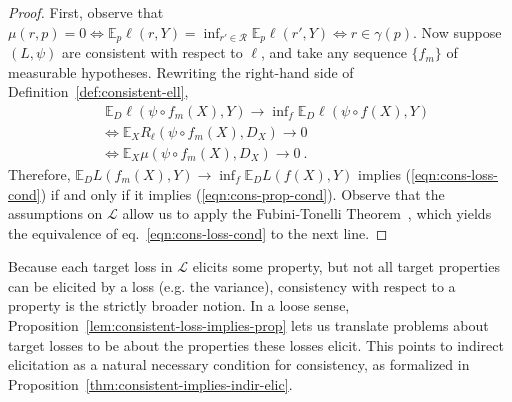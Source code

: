 \documentclass{article} %
\newcommand{\propdis}{\mu}
\newcommand{\E}{\mathbb{E}}
\renewcommand{\L}{\mathcal{L}}
\newcommand{\R}{\mathcal{R}}
\newcommand{\exploss}[3]{\E_{#3} #1(#2,Y)}
\begin{document}
\begin{proof}
	First, observe that $\propdis(r,p) = 0 \iff \exploss{\ell}{r}{p} = \inf_{r' \in \R} \exploss{\ell}{r'}{p} \iff r \in \gamma(p)$.
	Now suppose $(L, \psi)$ are consistent with respect to $\ell$, and take any sequence $\{f_m\}$ of measurable hypotheses.
	Rewriting the right-hand side of Definition~\ref{def:consistent-ell},
	\begin{align}
	&\; \E_D \ell(\psi \circ f_m(X), Y)\to \inf\nolimits_f \E_D \ell(\psi \circ f(X), Y)   \label{eqn:cons-loss-cond} \\
	&\iff \E_X R_\ell(\psi \circ f_m(X), D_X) \to 0                               \nonumber  \\
	&\iff \E_X \propdis(\psi \circ f_m(X), D_X) \to 0~.~                          \label{eqn:cons-prop-cond}
	\end{align}
	Therefore, $\mathbb{E}_D L(f_m(X),Y) \to \inf_f \mathbb{E}_D L(f(X),Y)$ implies (\ref{eqn:cons-loss-cond}) if and only if it implies (\ref{eqn:cons-prop-cond}).
	Observe that the assumptions on $\L$ allow us to apply the Fubini-Tonelli Theorem~\cite[Theorem 2.37]{folland1999real}, which yields the equivalence of eq.~\ref{eqn:cons-loss-cond} to the next line.
\end{proof}

Because each target loss in $\L$ elicits some property, but not all target properties can be elicited by a loss (e.g. the variance), consistency with respect to a property is the strictly broader notion.
In a loose sense, Proposition~\ref{lem:consistent-loss-implies-prop} lets us translate problems about target losses to be about the properties these losses elicit.
This points to indirect elicitation as a natural necessary condition for consistency, as formalized in Proposition~\ref{thm:consistent-implies-indir-elic}.

\consistencyimpliesindirelic*
\end{document}

